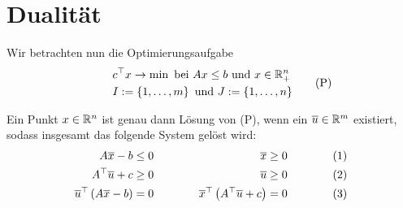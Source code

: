 \section{Dualität}

Wir betrachten nun die Optimierungsaufgabe
\begin{equation*}
	\begin{aligned}
		\qquad &c^{\top} x \to \min \text{ bei } Ax \le b \text{ und } x \in \mathbb{R}^n_+ \\
		&I \mathrel{:=} \left\{ 1, \dots, m \right\} \text{ und } J \mathrel{:=} \left\{ 1, \dots, n \right\}
	\end{aligned} \tag{P}
	\label{eq: P}
\end{equation*}

\begin{satz}[Charakterisierungssatz] %
	\label{satz: 3.9}
	Ein Punkt $x \in \mathbb{R}^n$ ist genau dann Lösung von (P), wenn ein $\overline{u} \in \mathbb{R}^m$ existiert, sodass insgesamt das folgende System gelöst wird:
	\begin{equation*}
		\begin{alignedat}{3}
			A \overline{x} - b &\le 0 \quad &\overline{x} &\ge 0 \qquad \qquad &(1) \\
			A^{\top} \overline{u} + c &\ge 0 \quad &\overline{u} &\ge 0 &(2) \\
			\overline{u}^{\top} \left( A \overline{x} - b \right) &= 0 \qquad \qquad &\overline{x}^{\top} \left( A^{\top}\overline{u} + c \right) &= 0 &(3)
		\end{alignedat}
	\end{equation*}
\end{satz}
